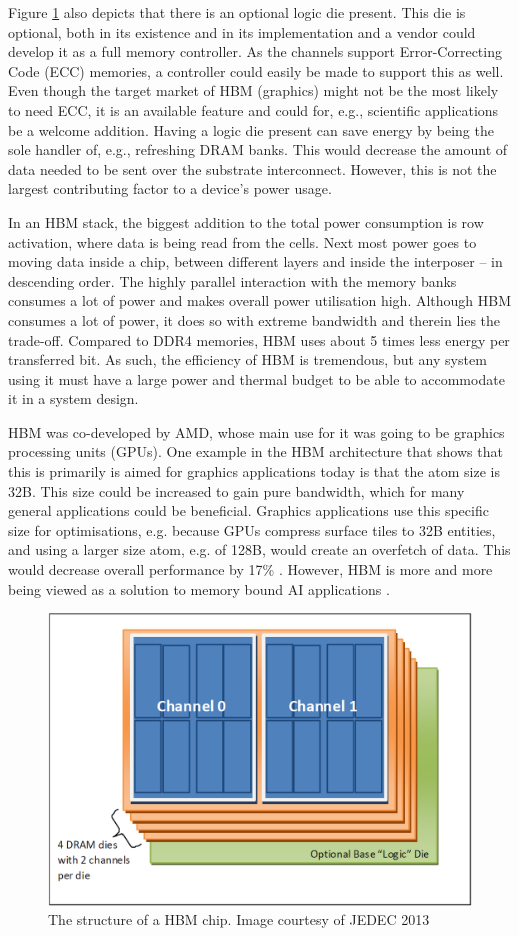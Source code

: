 Figure \ref{HBM-structure} also depicts that there is an optional logic die present. This die is optional, both in its existence and in its implementation and a vendor could develop it as a full memory controller. As the channels support Error-Correcting Code (ECC) memories, a controller could easily be made to support this as well. Even though the target market of HBM (graphics) might not be the most likely to need ECC, it is an available feature and could for, e.g., scientific applications be a welcome addition. Having a logic die present can save energy by being the sole handler of, e.g., refreshing DRAM banks. This would decrease the amount of data needed to be sent over the substrate interconnect. However, this is not the largest contributing factor to a device's power usage. 
\bigskip

In an HBM stack, the biggest addition to the total power consumption is row activation, where data is being read from the cells. Next most power goes to moving data inside a chip, between different layers and inside the interposer -- in descending order. The highly parallel interaction with the memory banks consumes a lot of power and makes overall power utilisation high. Although HBM consumes a lot of power, it does so with extreme bandwidth and therein lies the trade-off. Compared to DDR4 memories, HBM uses about 5 times less energy per transferred bit. As such, the efficiency of HBM is tremendous, but any system using it must have a large power and thermal budget to be able to accommodate it in a system design.
\bigskip

HBM was co-developed by AMD, whose main use for it was going to be graphics processing units (GPUs). One example in the HBM architecture that shows that this is primarily is aimed for graphics applications today is that the atom size is 32B. This size could be increased to gain pure bandwidth, which for many general applications could be beneficial. Graphics applications use this specific size for optimisations, e.g. because GPUs compress surface tiles to 32B entities, and using a larger size atom, e.g. of 128B, would create an overfetch of data. This would decrease overall performance by 17\% \cite{O'Connor:2017:FDE:3123939.3124545}. However, HBM is more and more being viewed as a solution to memory bound AI applications \cite{sperling_2019}.

\begin{figure}[!ht]
\centering
\includegraphics[width=0.75\linewidth]{figure/HBM_structure.PNG}
\caption{The structure of a HBM chip. Image courtesy of JEDEC 2013 }
\label{HBM-structure}
\end{figure}

